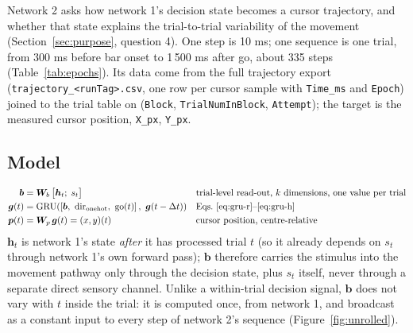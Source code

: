 \documentclass[11pt,a4paper]{article}
\newcommand{\vect}[1]{\bm{#1}}
\begin{document}
Network 2 asks how network 1's decision state becomes a cursor trajectory, and whether
that state explains the trial-to-trial variability of the movement (Section~\ref{sec:purpose}, question 4). One step is
10 ms; one sequence is one trial, from 300 ms before bar onset to 1\,500 ms after go,
about 335 steps (Table~\ref{tab:epochs}). Its data come from the full trajectory export
(\texttt{trajectory\_<runTag>.csv}, one row per cursor sample with \texttt{Time\_ms} and
\texttt{Epoch}) joined to the trial table on (\texttt{Block}, \texttt{TrialNumInBlock},
\texttt{Attempt}); the target is the measured cursor position, \texttt{X\_px},
\texttt{Y\_px}.

\subsection{Model}

\begin{align}
  \vect{b} &= \vect{W}_b\, \big[\vect{h}_t;\; s_t\big]
     && \text{trial-level read-out, $k$ dimensions, one value per trial} \label{eq:mot-b}\\
  \vect{g}(t) &= \mathrm{GRU}\!\left(\left[\vect{b},\ \mathrm{dir}_{\mathrm{onehot}},\ \mathrm{go}(t)\right],\ \vect{g}(t - \Delta t)\right)
     && \text{Eqs.~\eqref{eq:gru-r}--\eqref{eq:gru-h}} \label{eq:mot-g}\\
  \vect{p}(t) &= \vect{W}_p\, \vect{g}(t) = (x, y)(t)
     && \text{cursor position, centre-relative} \label{eq:mot-p}
\end{align}
$\vect{h}_t$ is network 1's state \emph{after} it has processed trial $t$ (so it already
depends on $s_t$ through network 1's own forward pass); $\vect{b}$ therefore carries the
stimulus into the movement pathway only through the decision state, plus $s_t$ itself,
never through a separate direct sensory channel. Unlike a within-trial decision signal,
$\vect{b}$ does not vary with $t$ inside the trial: it is computed once, from network 1,
and broadcast as a constant input to every step of network 2's sequence
(Figure~\ref{fig:unrolled}).
\end{document}
